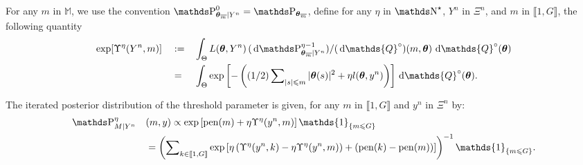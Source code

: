 \begin{pr}\label{PR_BAYES_HIERARCHICAL_ITERATED}
For any $m$ in $\mathds{M}$, we use the convention $\P_{\boldsymbol{\theta}_{\overline{m}}\vert Y^{n}}^{0} = \P_{\boldsymbol{\theta}_{\overline{m}}}$, define for any $\eta$ in $\N^{\star}$, $Y^{n}$ in $\Xi^{n}$, and $m$ in $\llbracket 1, G \rrbracket$, the following quantity
\begin{alignat*}{3}
& \exp[\Upsilon^{\eta}(Y^{n}, m)] &&:=&& \int_{\Theta}L(\boldsymbol{\theta}, Y^{n}) \, ( \d \P_{\boldsymbol{\theta}_{\overline{m}}\vert Y^{n}}^{\eta-1})/( \d \mathds{Q}^{\circ})(m, \boldsymbol{\theta}) \d \mathds{Q}^{\circ}(\boldsymbol{\theta})\\
& && = && \int_{\Theta} \exp\left[ - \left((1/2) \sum\nolimits_{\vert s \vert \leq m} \vert \boldsymbol{\theta}(s) \vert^{2} + \eta l(\boldsymbol{\theta}, y^{n})\right) \right]\d\mathds{Q}^{\circ}(\boldsymbol{\theta}).
\end{alignat*}

The iterated posterior distribution of the threshold parameter is given, for any $m$ in $\llbracket 1, G \rrbracket$ and $y^{n}$ in $\Xi^{n}$ by:
\begin{alignat*}{2}
&\P_{M \vert Y^{n}}^{\eta}&&(m, y) \propto \exp\left[\pen(m) + \eta \Upsilon^{\eta}(y^{n}, m)\right] \mathds{1}_{\{m \leq G\}}\\
& && = \left(\sum\nolimits_{k \in \llbracket 1, G \rrbracket}\exp\left[\eta \left(\Upsilon^{\eta}(y^{n}, k) - \eta \Upsilon^{\eta}(y^{n}, m)\right) + \left(\pen(k) - \pen(m)\right)\right]\right)^{-1} \mathds{1}_{\{m \leq G\}}.
\end{alignat*}
\end{pr}

